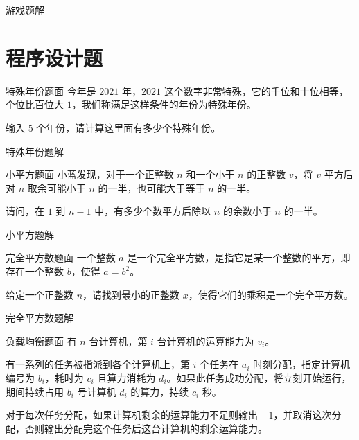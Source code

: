 \documentclass{pptt}
\begin{document}
\begin{frame}{游戏}{题解}
\end{frame}

\section{程序设计题}

\begin{frame}{特殊年份}{题面}
    今年是 $2021$ 年，$2021$ 这个数字非常特殊，它的千位和十位相等，个位比百位大 $1$，我们称满足这样条件的年份为特殊年份。

    输入 $5$ 个年份，请计算这里面有多少个特殊年份。
\end{frame}

\begin{frame}{特殊年份}{题解}
\end{frame}

\begin{frame}{小平方}{题面}
    小蓝发现，对于一个正整数 $n$ 和一个小于 $n$ 的正整数 $v$，将 $v$ 平方后对 $n$ 取余可能小于 $n$ 的一半，也可能大于等于 $n$ 的一半。

    请问，在 $1$ 到 $n-1$ 中，有多少个数平方后除以 $n$ 的余数小于 $n$ 的一半。
\end{frame}

\begin{frame}{小平方}{题解}
\end{frame}

\begin{frame}{完全平方数}{题面}
    一个整数 $a$ 是一个完全平方数，是指它是某一个整数的平方，即存在一个整数 $b$，使得 $a=b^2$。

    给定一个正整数 $n$，请找到最小的正整数 $x$，使得它们的乘积是一个完全平方数。
\end{frame}

\begin{frame}{完全平方数}{题解}
\end{frame}

\begin{frame}{负载均衡}{题面}
    有 $n$ 台计算机，第 $i$ 台计算机的运算能力为 $v_i$。

    有一系列的任务被指派到各个计算机上，第 $i$ 个任务在 $a_i$ 时刻分配，指定计算机编号为 $b_i$，耗时为 $c_i$ 且算力消耗为 $d_i$。如果此任务成功分配，将立刻开始运行，期间持续占用 $b_i$ 号计算机 $d_i$ 的算力，持续 $c_i$ 秒。

    对于每次任务分配，如果计算机剩余的运算能力不足则输出 $-1$，并取消这次分配，否则输出分配完这个任务后这台计算机的剩余运算能力。
\end{frame}
\end{document}
